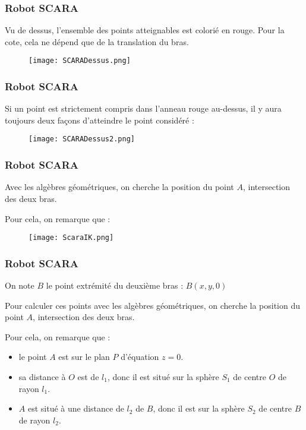\documentclass{beamer}
\begin{document}
\begin{frame}
\frametitle{Robot SCARA}

Vu de dessus, l'ensemble des points atteignables est colorié en rouge. Pour la cote, cela ne dépend que de la translation du bras.

\begin{figure}[!ht]
\texttt{[image: SCARADessus.png]}
\end{figure}
\end{frame}

\begin{frame}
\frametitle{Robot SCARA}
Si un point est strictement compris dans l'anneau rouge au-dessus, il y aura toujours deux façons d'atteindre le point considéré : 

\begin{figure}[!ht]
\centering
\texttt{[image: SCARADessus2.png]}
\end{figure}
\end{frame}

\begin{frame}
\frametitle{Robot SCARA}


Avec les algèbres géométriques, on cherche la position du point $A$, intersection des deux bras.


Pour cela, on remarque que : 
\end{frame}

\begin{frame}
\begin{figure}[!ht]
\texttt{[image: ScaraIK.png]}
\end{figure}
\end{frame}

\begin{frame}
\frametitle{Robot SCARA}
On note $B$ le point extrémité du deuxième bras : $B(x,y,0)$

Pour calculer ces points avec les algèbres géométriques, on cherche la position du point $A$, intersection des deux bras.


Pour cela, on remarque que : 
\begin{itemize}
\item le point $A$ est sur le plan $P$ d'équation $z=0$. 
\item sa distance à $O$ est de $l_1$, donc il est situé sur la sphère $S_1$ de centre $O$ de rayon $l_1$. 
\item $A$ est situé à une distance de $l_2$ de $B$, donc il est sur la sphère $S_2$ de centre $B$ de rayon $l_2$. 
\end{itemize}


\end{frame}
\end{document}
